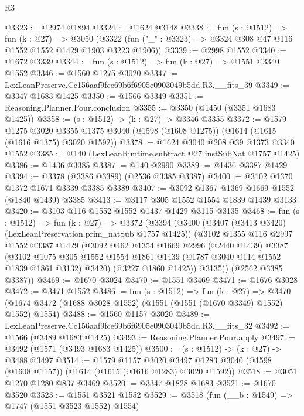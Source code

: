 \begin{lexlean}{R3}
\begin{coremodule}
@3323 := @2974 @1894
@3324 := @1624 @3148
@3338 := fun (s : @1512) =>
  fun (k : @27) =>
  @3050 (@3322 (fun ("_" : @3323) => @3324 @308 @47 @116 @1552 @1552 @1429 @1903 @3223 @1906))
@3339 := @2998 @1552
@3340 := @1672 @3339
@3344 := fun (s : @1512) => fun (k : @27) => @1551 @3340 @1552
@3346 := @1560 @1275 @3020
@3347 := LexLeanPreserve.Cc156aaf9fce69b6f6905e0903049b5dd.R3.__fits_39
@3349 := @3347 @1683 @1425
@3350 := @1566 @3349
@3351 := Reasoning.Planner.Pour.conclusion
@3355 := @3350 (@1450 (@3351 @1683 @1425))
@3358 := (s : @1512) -> (k : @27) -> @3346 @3355
@3372 := @1579
    @1275
    @3020
    @3355
    @1375
    @3040
    (@1598 (@1608 @1275))
    (@1614 (@1615 (@1616 @1375) @3020 @1592))
@3378 := @1624 @3040 @208 @39 @1373 @3340 @1552
@3385 := @140 (LexLeanRuntime.subtract @27 instSubNat @1757 @1425)
@3386 := @1436 @3385
@3387 := @140 @2990
@3389 := @1436 @3387 @1429
@3394 := @3378 (@3386 @3389) (@2536 @3385 @3387)
@3400 := @3102 @1370 @1372 @1671 @3339 @3385 @3389
@3407 := @3092 @1367 @1369 @1669 @1552 (@1840 @1439) @3385
@3413 := @3117 @305 @1552 @1554 @1839 @1439 @3133
@3420 := @3103 @116 @1552 @1552 @1437 @1429 @3115 @3135
@3468 := fun (s : @1512) =>
  fun (k : @27) =>
  @3372
    (@3394
      (@3400
        (@3407 (@3413 @3420) (LexLeanPreservation.prim_natSub @1757 @1425))
        (@3102
          @1355
          @116
          @2997
          @1552
          @3387
          @1429
          (@3092
            @462
            @1354
            @1669
            @2996
            (@2440 @1439)
            @3387
            (@3102
              @1075
              @305
              @1552
              @1554
              @1861
              @1439
              (@1787 @3040 @114 @1552 @1839 @1861 @3132)
              @3420)
            (@3227 @1860 @1425))
          @3135))
      (@2562 @3385 @3387))
@3469 := @1670 @3024
@3470 := @1551 @3469
@3471 := @1676 @3028
@3472 := @3471 @1552
@3486 := fun (s : @1512) =>
  fun (k : @27) =>
  @3470 (@1674 @3472 (@1688 @3028 @1552) (@1551 (@1551 (@1670 @3349) @1552) @1552) @1554)
@3488 := @1560 @1157 @3020
@3489 := LexLeanPreserve.Cc156aaf9fce69b6f6905e0903049b5dd.R3.__fits_32
@3492 := @1566 (@3489 @1683 @1425)
@3493 := Reasoning.Planner.Pour.apply
@3497 := @3492 (@1571 (@3493 @1683 @1425))
@3500 := (s : @1512) -> (k : @27) -> @3488 @3497
@3514 := @1579
    @1157
    @3020
    @3497
    @1283
    @3040
    (@1598 (@1608 @1157))
    (@1614 (@1615 (@1616 @1283) @3020 @1592))
@3518 := @3051 @1270 @1280 @837 @3469
@3520 := @3347 @1828 @1683
@3521 := @1670 @3520
@3523 := @1551 @3521 @1552
@3529 := @3518 (fun (__b : @1549) => @1747 (@1551 @3523 @1552) @1554)

\end{coremodule}
\end{lexlean}
